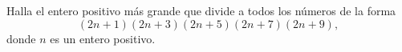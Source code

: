 Halla el entero positivo más grande que divide a todos los números de la forma
\[(2n + 1)(2n + 3)(2n + 5)(2n + 7)(2n + 9),\]
donde $n$ es un entero positivo.